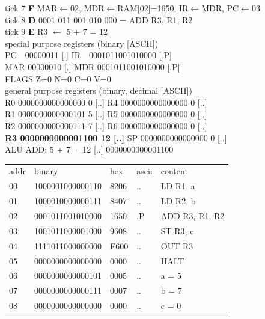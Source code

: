\noindent\begin{tcolorbox}[stepbox, title={Instruction 3 \hfill ticks 7 to 9 \quad ADD R3, R1, R2}]
\textcolor{dim}{tick 7} \textbf{F} MAR$\leftarrow$02, MDR$\leftarrow$RAM[02]=1650, IR$\leftarrow$MDR, PC$\leftarrow$03\\
\textcolor{dim}{tick 8} \textbf{D} 0001 011 001 010 000 = ADD R3, R1, R2\\
\textcolor{dim}{tick 9} \textbf{E} R3 $\leftarrow$ 5 + 7 = 12\\[2pt]
\textcolor{dim}{special purpose registers (binary [ASCII])}\\
PC~~00000011 [.] \hfill IR~~0001011001010000 [.P]\\
MAR 00000010 [.] \hfill MDR 0001011001010000 [.P]\\
FLAGS Z=0 N=0 C=0 V=0\\[2pt]
\textcolor{dim}{general purpose registers (binary, decimal [ASCII])}\\
R0 0000000000000000 0 [..] \hfill R4 0000000000000000 0 [..]\\
R1 0000000000000101 5 [..] \hfill R5 0000000000000000 0 [..]\\
R2 0000000000000111 7 [..] \hfill R6 0000000000000000 0 [..]\\
\textcolor{wrt}{\textbf{R3 0000000000001100 12 [..]}} \hfill SP 0000000000000000 0 [..]\\
\textcolor{dim}{ALU} ADD: 5 + 7 = 12 [..] \hfill 0000000000001100\\[2pt]
{\setlength{\tabcolsep}{2pt}\begin{tabular}{@{}lllll@{}}
\textcolor{dim}{addr} & \textcolor{dim}{binary} & \textcolor{dim}{hex} & \textcolor{dim}{ascii} & \textcolor{dim}{content}\\
00 & 1000001000000110 & 8206 & .. & LD R1, a\\
01 & 1000010000000111 & 8407 & .. & LD R2, b\\
02 & 0001011001010000 & 1650 & .P & ADD R3, R1, R2\\
\rowcolor{pcc}03 & 1001011000001000 & 9608 & .. & ST R3, c\\
04 & 1111011000000000 & F600 & .. & OUT R3\\
05 & 0000000000000000 & 0000 & .. & HALT\\
\rowcolor{datac}06 & 0000000000000101 & 0005 & .. & a = 5\\
\rowcolor{datac}07 & 0000000000000111 & 0007 & .. & b = 7\\
\rowcolor{datac}08 & 0000000000000000 & 0000 & .. & c = 0\\

\end{tabular}}
\end{tcolorbox}
